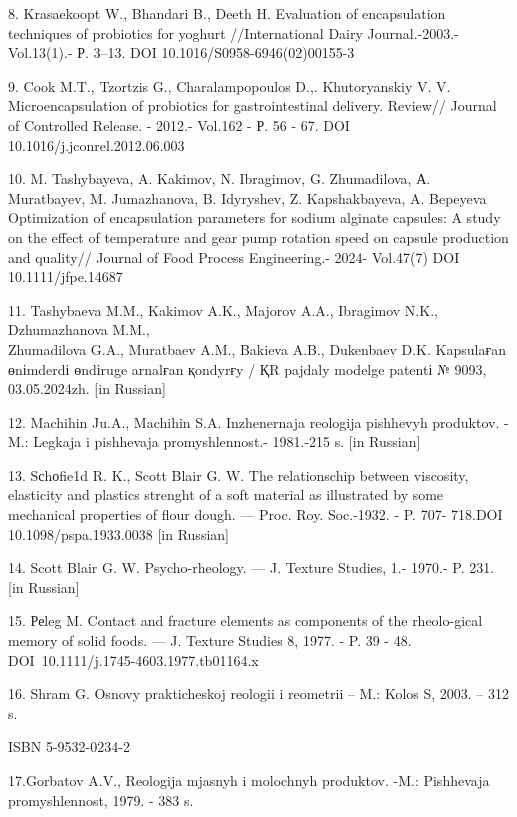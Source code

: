 \begin{noparindent}
8. Krasaekoopt W., Bhandari B., Deeth H. Evaluation of encapsulation
techniques of probiotics for yoghurt //International Dairy
Journal.-2003.- Vol.13(1).- Р. 3--13. DOI 10.1016/S0958-6946(02)00155-3

9. Cook M.T., Tzortzis G., Charalampopoulos D.,. Khutoryanskiy V. V.
Microencapsulation of probiotics for gastrointestinal delivery. Review//
Journal of Controlled Release. - 2012.- Vol.162 - Р. 56 - 67. DOI
10.1016/j.jconrel.2012.06.003

10. M. Tashybayeva, A. Kakimov, N. Ibragimov, G. Zhumadilova, А.
Muratbayev, M. Jumazhanova, B. Idyryshev, Z. Kapshakbayeva, A. Bepeyeva
Optimization of encapsulation parameters for sodium alginate capsules: A
study on the effect of temperature and gear pump rotation speed on
capsule production and quality// Journal of Food Process Engineering.-
2024- Vol.47(7) DOI 10.1111/jfpe.14687

11. Tashybaeva M.M., Kakimov A.K., Majorov A.A., Ibragimov N.K.,
Dzhumazhanova M.M., \\Zhumadilova G.A., Muratbaev A.M., Bakieva A.B.,
Dukenbaev D.K. Kapsulaғan өnіmderdі өndіruge arnalғan қondyrғy / ҚR
pajdaly model\textquotesingle ge patentі № 9093, 03.05.2024zh. {[}in
Russian{]}

12. Machihin Ju.A., Machihin S.A. Inzhenernaja reologija pishhevyh
produktov. - M.: Legkaja i pishhevaja promyshlennost\textquotesingle.-
1981.-215 s. {[}in Russian{]}

13. Sсhоfie1d R. K., Scott Blair G. W. The relationschip between
viscosity, elasticity and plastics strenght of a soft material as
illustrated by some mechanical properties of flour dough. --- Proc. Roy.
Soc.-1932. - P. 707- 718.DOI 10.1098/pspa.1933.0038 {[}in Russian{]}

14. Scott Blair G. W. Psycho-rheology. --- J. Texture Studies, 1.-
1970.- P. 231. {[}in Russian{]}

15. Реleg M. Contact and fracture elements as components of the
rheolo-gical memory of solid foods. --- J. Texture Studies 8, 1977. - P.
39 - 48. DOI~10.1111/j.1745-4603.1977.tb01164.x

16. Shram G. Osnovy prakticheskoj reologii i reometrii -- M.: Kolos S,
2003. -- 312 s.

ISBN 5-9532-0234-2

17.Gorbatov A.V., Reologija mjasnyh i molochnyh produktov. -M.:
Pishhevaja promyshlennost\textquotesingle, 1979. - 383 s.

\end{noparindent}

